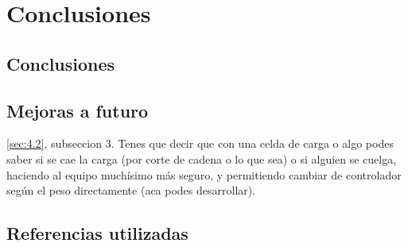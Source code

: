 \chapter{Conclusiones}
\thispagestyle{empty}

\section{Conclusiones} \label{sec:\thesection}
 
\section{Mejoras a futuro} \label{sec:\thesection}
\ref{sec:4.2}, subseccion 3. Tenes que decir que con una celda de carga o algo podes saber si se cae la carga (por corte de cadena o lo que sea) o si alguien se cuelga, haciendo al equipo muchísimo más seguro, y permitiendo cambiar de controlador según el peso directamente (aca podes desarrollar).

\section{Referencias utilizadas} \label{sec:\thesection}